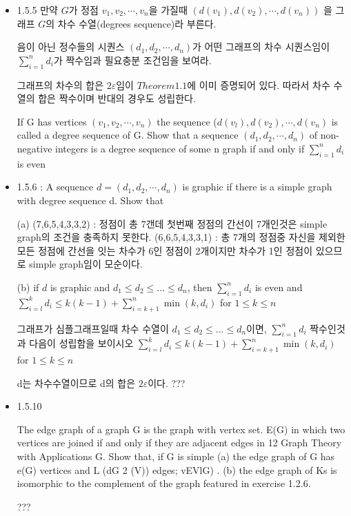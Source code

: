 \documentclass{oblivoir}
\begin{document}
\begin{itemize}
    \item 1.5.5
    만약 $G$가 정점 $v_1, v_2, \cdots , v_n$을 가질때 $(d(v_1), d(v_2), \cdots , d(v_n))$ 을 그래프 $G$의 차수 수열(degrees sequence)라 부른다.
    
    음이 아닌 정수들의 시퀀스 $(d_1, d_2, \cdots , d_n)$가 어떤 그래프의 차수 시퀀스임이 $\sum_{i=1}^n d_i$가 짝수임과 필요충분 조건임을 보여라.

    그래프의 차수의 합은 $2\varepsilon$임이  $Theorem1.1$에 이미 증명되어 있다. 따라서 차수 수열의 합은 짝수이며 반대의 경우도 성립한다.
    
    
    If G has vertices $(v_1, v_2, \cdots , v_n)$ the sequence ($d(v_l), d(v_2), \cdots , d(v_n)$ is called a degree sequence of G. 
    Show that a sequence $(d_1, d_2, \cdots , d_n)$ of non-negative integers is a degree sequence of some n
    graph if and only if $\sum_{i=1}^n d_i$ is even

    \item 1.5.6 : A sequence $d = (d_1, d_2 , \cdots , d_n)$ is graphic if there is a simple graph with degree sequence d. Show that

    (a) (7,6,5,4,3,3,2) : 정점이 총 7갠데 첫번째 정점의 간선이 7개인것은 simple graph의 조건을 충족하지 못한다.
    (6,6,5,4,3,3,1) : 총 7개의 정점중 자신을 제외한 모든 정점에 간선을 잇는 차수가 6인 정점이 2개이지만 차수가 1인 정점이 있으므로  simple graph임이 모순이다.

    (b) if $d$ is graphic and $d_1 \le d_2 \le ... \le d_n$, then $\sum_{i=1}^{n} d_i$ is even and $\sum_{i=l}^{k} d_i \le k(k -1)+\sum_{i=k+1}^{n}\min(k, d_i)$ for $1 \le k \le n$

    그래프가 심플그래프일때 차수 수열이 $d_1 \le d_2 \le ... \le d_n$이면,  $\sum_{i=1}^{n} d_i$ 짝수인것과 다음이 성립함을 보이시오
    $\sum_{i=l}^{k} d_i \le k(k -1)+\sum_{i=k+1}^{n}\min(k, d_i)$ for $1 \le k \le n$
    
    d는 차수수열이므로 d의 합은 $2\varepsilon$이다.
???
    \item 1.5.10
    
    The edge graph of a graph G is the graph with vertex set. E(G) in
    which two vertices are joined if and only if they are adjacent edges in
    12 Graph Theory with Applications
    G. Show that, if G is simple
    (a) the edge graph of G has e(G) vertices and L (dG
    2
    (V)) edges;
    vEVlG) .
    (b) the edge graph of Ks is isomorphic to the complement of the
    graph featured in exercise 1.2.6.
    
???




\end{itemize}
\end{document}
